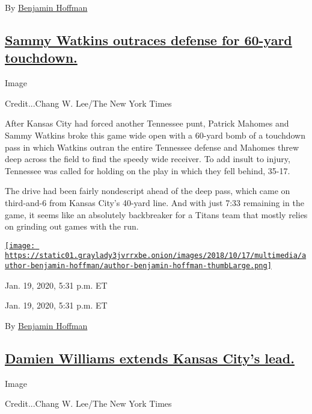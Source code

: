 By
\href{https://www.nytimes3xbfgragh.onion/by/benjamin-hoffman}{Benjamin
Hoffman}

\hypertarget{sammy-watkins-outraces-defense-for-60-yard-touchdown}{%
\subsection{\texorpdfstring{\protect\hyperlink{sammy-watkins-outraces-defense-for-60-yard-touchdown}{Sammy
Watkins outraces defense for 60-yard
touchdown.}}{Sammy Watkins outraces defense for 60-yard touchdown.}}\label{sammy-watkins-outraces-defense-for-60-yard-touchdown}}

Image

Credit...Chang W. Lee/The New York Times

After Kansas City had forced another Tennessee punt, Patrick Mahomes and
Sammy Watkins broke this game wide open with a 60-yard bomb of a
touchdown pass in which Watkins outran the entire Tennessee defense and
Mahomes threw deep across the field to find the speedy wide receiver. To
add insult to injury, Tennessee was called for holding on the play in
which they fell behind, 35-17.

The drive had been fairly nondescript ahead of the deep pass, which came
on third-and-6 from Kansas City's 40-yard line. And with just 7:33
remaining in the game, it seems like an absolutely backbreaker for a
Titans team that mostly relies on grinding out games with the run.

\href{https://www.nytimes3xbfgragh.onion/by/benjamin-hoffman}{\texttt{[image: https://static01.graylady3jvrrxbe.onion/images/2018/10/17/multimedia/author-benjamin-hoffman/author-benjamin-hoffman-thumbLarge.png]}}

Jan. 19, 2020, 5:31 p.m. ET

Jan. 19, 2020, 5:31 p.m. ET

By
\href{https://www.nytimes3xbfgragh.onion/by/benjamin-hoffman}{Benjamin
Hoffman}

\hypertarget{damien-williams-extends-kansas-citys-lead}{%
\subsection{\texorpdfstring{\protect\hyperlink{damien-williams-extends-kansas-citys-lead}{Damien
Williams extends Kansas City's
lead.}}{Damien Williams extends Kansas City's lead.}}\label{damien-williams-extends-kansas-citys-lead}}

Image

Credit...Chang W. Lee/The New York Times

